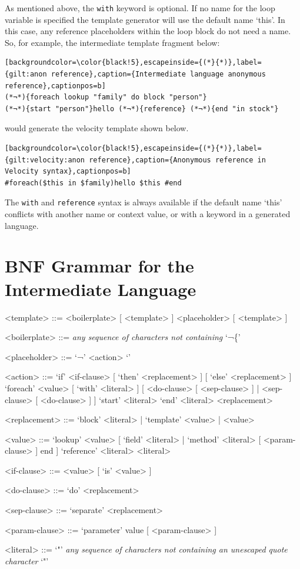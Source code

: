 As mentioned above, the \verb!with! keyword is optional. If no name for the loop variable is specified the template generator will use the default name `this'. In this case, any reference placeholders within the loop block do not need a name. So, for example, the intermediate template fragment below:

\begin{lstlisting}[backgroundcolor=\color{black!5},escapeinside={(*}{*)},label={gilt:anon reference},caption={Intermediate language anonymous reference},captionpos=b]
(*¬*){foreach lookup "family" do block "person"}
(*¬*){start "person"}hello (*¬*){reference} (*¬*){end "in stock"}
\end{lstlisting}

would generate the velocity template shown below.

\begin{lstlisting}[backgroundcolor=\color{black!5},escapeinside={(*}{*)},label={gilt:velocity:anon reference},caption={Anonymous reference in Velocity syntax},captionpos=b]
#foreach($this in $family)hello $this #end
\end{lstlisting}

The \verb!with! and \verb!reference! syntax is always available if the default name `this' conflicts with another name or context value, or with a keyword in a generated language.

\section*{BNF Grammar for the Intermediate Language}

\label{appendix:bnf initial}
\setlength{\grammarindent}{4em} %
\begin{grammar}

<template> ::= <boilerplate> [ <template> ] \alt <placeholder> [ <template> ]

<boilerplate> ::= \emph{any sequence of characters not containing} `¬\{'

<placeholder> ::= `¬{' <action> `}'

<action> ::= `if' <if-clause> [ `then' <replacement> ] [ `else' <replacement> ]
\alt `foreach' <value>  [ `with' <literal> ] [ <do-clause> [ <sep-clause> ] | <sep-clause> [ <do-clause> ] ]
\alt `start' <literal>
\alt `end' <literal>
\alt <replacement>

<replacement> ::= `block' <literal> | `template' <value> | <value>

<value> ::= `lookup' <value> [ `field' <literal> | `method' <literal> [ <param-clause> ] end ]
\alt `reference' <literal>
\alt <literal>

<if-clause> ::= <value> [ `is' <value> ]

<do-clause> ::= `do' <replacement>

<sep-clause> ::= `separate' <replacement>

<param-clause> ::= `parameter' value [ <param-clause> ] 

<literal> ::= `"' \emph{any sequence of characters not containing an unescaped quote character} `"' 

\end{grammar}



